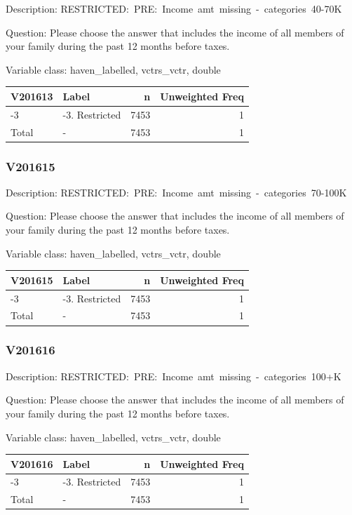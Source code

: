 \documentclass[
]{krantz}
\begin{document}
Description: RESTRICTED:~PRE:~Income~amt~missing~-~categories~40-70K

Question: Please choose the answer that includes the income of all members of your family during the past 12 months before taxes.

Variable class: haven\_labelled, vctrs\_vctr, double

\begin{tabular}[t]{l|l|r|r}
\hline
V201613 & Label & n & Unweighted Freq\\
\hline
-3 & -3. Restricted & 7453 & 1\\
\hline
Total & - & 7453 & 1\\
\hline
\end{tabular}

\hypertarget{v201615}{%
\subsubsection*{V201615}\label{v201615}}


Description: RESTRICTED:~PRE:~Income~amt~missing~-~categories~70-100K

Question: Please choose the answer that includes the income of all members of your family during the past 12 months before taxes.

Variable class: haven\_labelled, vctrs\_vctr, double

\begin{tabular}[t]{l|l|r|r}
\hline
V201615 & Label & n & Unweighted Freq\\
\hline
-3 & -3. Restricted & 7453 & 1\\
\hline
Total & - & 7453 & 1\\
\hline
\end{tabular}

\hypertarget{v201616}{%
\subsubsection*{V201616}\label{v201616}}


Description: RESTRICTED:~PRE:~Income~amt~missing~-~categories~100+K

Question: Please choose the answer that includes the income of all members of your family during the past 12 months before taxes.

Variable class: haven\_labelled, vctrs\_vctr, double

\begin{tabular}[t]{l|l|r|r}
\hline
V201616 & Label & n & Unweighted Freq\\
\hline
-3 & -3. Restricted & 7453 & 1\\
\hline
Total & - & 7453 & 1\\
\hline
\end{tabular}
\end{document}
